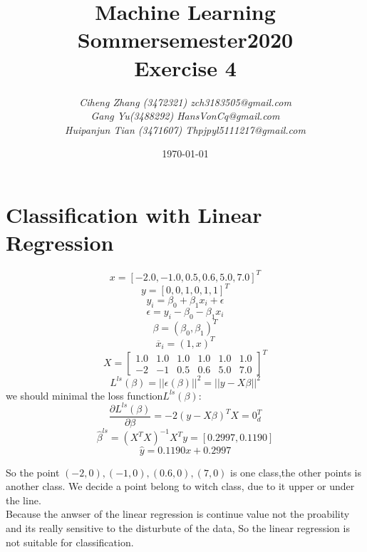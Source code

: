 \documentclass{article}
\begin{document}
\begin{titlepage}
    \title{\Huge \textbf{Machine Learning\\Sommersemester2020\\Exercise 4} }
    \author{\LARGE \textsl{Ciheng Zhang (3472321) zch3183505@gmail.com}\\\LARGE \textsl{Gang Yu(3488292) HansVonCq@gmail.com}\\\LARGE \textsl{Huipanjun Tian (3471607)  Thpjpyl5111217@gmail.com} \\[200pt]}
    \date{\today}
    \maketitle
    \thispagestyle{empty}
\end{titlepage}
\newpage
\section{Classification with Linear Regression}
\[x=[-2.0,-1.0,0.5,0.6,5.0,7.0]^T\]
\[y=[0,0,1,0,1,1]^T\]
\[y_i=\beta_0+\beta_1x_i+\epsilon\]
\[\epsilon=y_i-\beta_0-\beta_1x_i\]
\[\beta=(\beta_0,\beta_1)^T\]
\[\overline{x}_i=(1,x)^T\]
\[X=\left[\begin{matrix}
    1.0&1.0&1.0&1.0&1.0&1.0\\
    {-2}&{-1}&0.5&0.6&5.0&7.0
\end{matrix}\right]^T\]
\[L^{ls}(\beta)=||\epsilon(\beta)||^2=||y-X\beta||^2\]
we should minimal the loss function$L^{ls}(\beta)$:
\[\frac{\partial L^{ls}(\beta)}{\partial \beta}=-2(y-X\beta)^TX=0^T_d\]
\[\hat{\beta}^{ls}=(X^TX)^{-1}X^Ty=[0.2997,0.1190]\]
\[\hat{y}=0.1190x+0.2997\]
\begin{center}
\end{center}
So the point $(-2,0),(-1,0),(0.6,0),(7,0)$ is one class,the other points is another class. We decide a point belong to witch class, due to it upper or under the line.
\\Because the anwser of the linear regression is continue value not the proability and its really sensitive to the disturbute of the data, So the linear regression is not suitable for classification.
\end{document}
